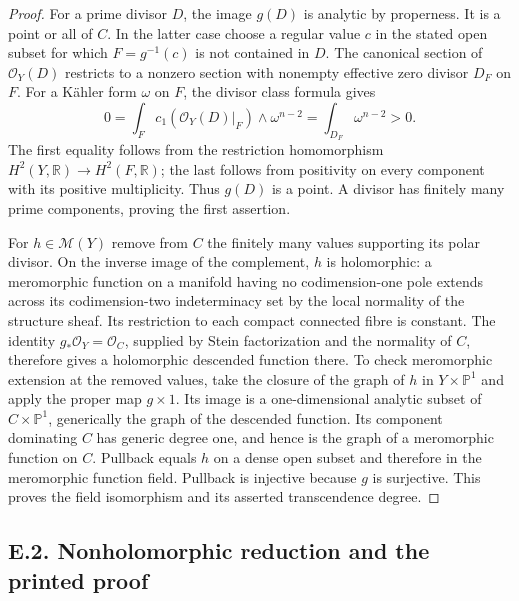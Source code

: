 \begin{proof}
For a prime divisor $D$, the image $g(D)$ is analytic by properness. It
is a point or all of $C$. In the latter case choose a regular value $c$
in the stated open subset for which $F=g^{-1}(c)$ is not contained in
$D$. The canonical section of $\mathcal O_Y(D)$ restricts to a nonzero
section with nonempty effective zero divisor $D_F$ on $F$. For a
K\"ahler form $\omega$ on $F$, the divisor class formula gives
\[
 0=\int_F c_1(\mathcal O_Y(D)|_F)\wedge\omega^{n-2}
   =\int_{D_F}\omega^{n-2}>0.
\]
The first equality follows from the restriction homomorphism
$H^2(Y,\mathbb R)\to H^2(F,\mathbb R)$; the last follows from positivity
on every component with its positive multiplicity. Thus $g(D)$ is a
point. A divisor has finitely many prime components, proving the first
assertion.

For $h\in\mathcal M(Y)$ remove from $C$ the finitely many values
supporting its polar divisor. On the inverse image of the complement,
$h$ is holomorphic: a meromorphic function on a manifold having no
codimension-one pole extends across its codimension-two indeterminacy
set by the local normality of the structure sheaf. Its restriction to
each compact connected fibre is constant. The identity
$g_*\mathcal O_Y=\mathcal O_C$, supplied by Stein factorization and
the normality of $C$, therefore gives a holomorphic descended function
there. To check meromorphic extension at the removed values, take the
closure of the graph of $h$ in $Y\times\mathbb P^1$ and apply the proper
map $g\times1$. Its image is a one-dimensional analytic subset of
$C\times\mathbb P^1$, generically the graph of the descended function.
Its component dominating $C$ has generic degree one, and hence is the
graph of a meromorphic function on $C$. Pullback equals $h$ on a dense
open subset and therefore in the meromorphic function field. Pullback
is injective because $g$ is surjective. This proves the field
isomorphism and its asserted transcendence degree.
\end{proof}


\subsection{E.2. Nonholomorphic reduction and the printed proof}


